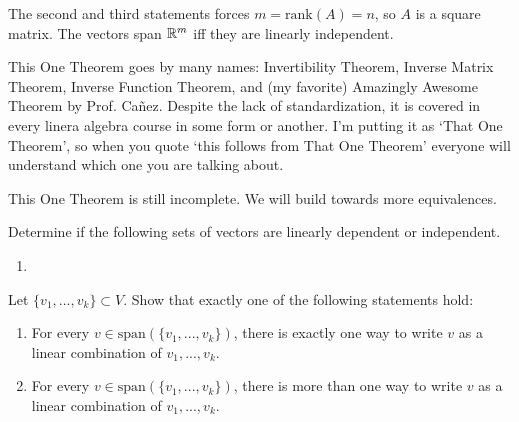 The second and third statements forces $m=\textrm{rank}(A)=n$, so $A$ is a square matrix. The vectors span $\mathbb{R}^m$ iff they are linearly independent.
\begin{remark}
	This One Theorem goes by many names: Invertibility Theorem, Inverse Matrix Theorem, Inverse Function Theorem, and (my favorite) Amazingly Awesome Theorem by Prof. Ca\~nez.
	Despite the lack of standardization, it is covered in every linera algebra course in some form or another.
	I'm putting it as `That One Theorem', so when you quote `this follows from That One Theorem' everyone will understand which one you are talking about. 
\end{remark}
\begin{remark}
	This One Theorem is still incomplete. We will build towards more equivalences.
\end{remark}
\exercises
\begin{exerciselist}
	\item Determine if the following sets of vectors are linearly dependent or independent. \begin{enumerate}[label=(\alph*)]
		\item 
	\end{enumerate}
	\item Let $\{v_1,...,v_k\}\subset V$. Show that exactly one of the following statements hold: \begin{enumerate}[label=(\alph*)]
		\item For every $v\in \textrm{span}(\{v_1,...,v_k\})$, there is exactly one way to write $v$ as a linear combination of $v_1,...,v_k$.
		\item For every $v\in \textrm{span}(\{v_1,...,v_k\})$, there is more than one way to write $v$ as a linear combination of $v_1,...,v_k$.
	\end{enumerate}
\end{exerciselist}

